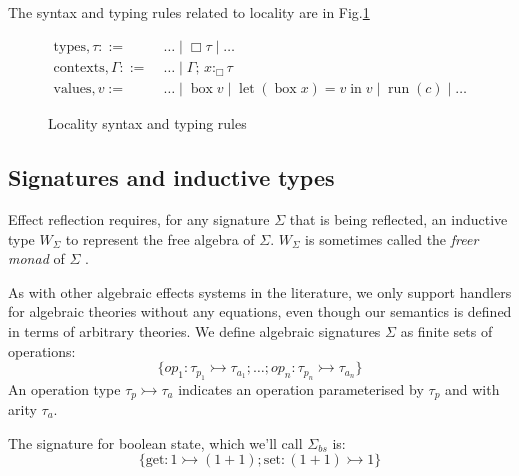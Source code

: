 \documentclass[acmsmall, screen, nonacm]{acmart}
\theoremstyle{definition}
\newcommand{\glob}{\mathop{\Box}}
\newcommand{\ind}[1]{W_{#1}}
\newcommand{\types}{\mathrel{:}}
\newcommand{\gtypes}{\mathrel{:_{\Box}}}
\newcommand{\ccons}[2]{#1;\,#2}
\newcommand{\gbind}[3]{\ccons{#1}{#2\gtypes#3}}
\newcommand{\cdiv}[1]{#1/\Box}
\newcommand{\gbox}[1]{\mathop{\mathrm{box}} #1}
\newcommand{\gunbox}[3]{\mathop{\mathrm{let}} (\gbox #1) = #2 \mathop{\mathrm{in}} #3}
\newcommand{\grun}[1]{\mathop{\mathrm{run}}(#1)}
\newcommand{\turnv}{\mathrel{\vdash_V}}
\newcommand{\turnc}{\mathrel{\vdash_C}}
\begin{document}
The syntax and typing rules related to locality are in
Fig.\ref{fig:typing-locality}
\begin{figure}
\begin{align*}
  \mathrm{types}, \tau ::=\;& \ldots \mid \glob \tau \mid \ldots \\
  \mathrm{contexts}, \Gamma ::=\;& \ldots \mid \gbind{\Gamma}{x}{\tau} \\
  \mathrm{values}, v :=\;& \ldots \mid \gbox{v} \mid \gunbox{x}{v}{v}
                           \mid \grun{c} \mid \ldots
\end{align*}
\caption{Locality syntax and typing rules}
\label{fig:typing-locality}
\end{figure}

\subsection{Signatures and inductive types}

Effect reflection requires, for any signature $\Sigma$ that is being
reflected, an inductive type $\ind{\Sigma}$ to represent the free
algebra of $\Sigma$. $\ind{\Sigma}$ is sometimes called the \emph{freer
  monad} of $\Sigma$ \cite{??}.

As with other algebraic effects systems in the literature, we only
support handlers for algebraic theories without any equations, even
though our semantics is defined in terms of arbitrary theories. We
define algebraic signatures $\Sigma$ as finite sets of operations:
\begin{equation*}
\{ op_1 \types \tau_{p_1} \rightarrowtail \tau_{a_1}; \ldots; op_n
\types \tau_{p_n} \rightarrowtail \tau_{a_n} \}
\end{equation*}
An operation type $\tau_p \rightarrowtail \tau_a$ indicates an operation
parameterised by $\tau_p$ and with arity $\tau_a$.

\begin{example}
  The signature for boolean state, which we'll call $\Sigma_{bs}$
  is:
  \begin{equation*}
    \{ \mathrm{get} \types 1 \rightarrowtail (1 + 1);
       \mathrm{set} \types (1 + 1) \rightarrowtail 1 \}
  \end{equation*}
\end{example}
\end{document}
